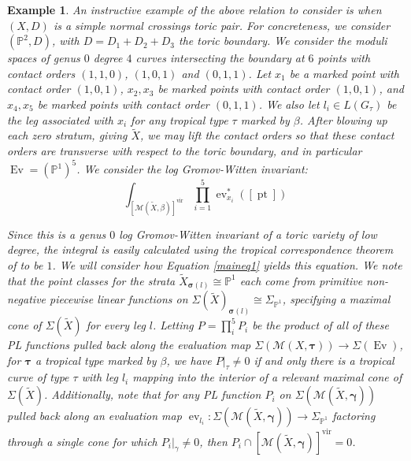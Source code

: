 \documentclass[12pt, oneside]{amsart}   	%
\newcounter{thm}
\newtheorem{example}[thm]{Example}
\newcommand{\vir}{\operatorname{vir}}
\newcommand{\pt}{\operatorname{pt}}
\newcommand{\ev}{\operatorname{ev}}
\newcommand{\Ev}{\operatorname{Ev}}
\numberwithin{equation}{section}
\numberwithin{thm}{section}
\numberwithin{figure}{section}
\begin{document}
\begin{example}
An instructive example of the above relation to consider is when $(X,D)$ is a simple normal crossings toric pair. For concreteness, we consider $(\mathbb{P}^2,D)$, with $D = D_1 + D_2+D_3$ the toric boundary. We consider the moduli spaces of genus $0$ degree $4$ curves intersecting the boundary at $6$ points with contact orders $(1,1,0)$, $(1,0,1)$ and $(0,1,1)$. Let $x_1$ be a marked point with contact order $(1,0,1)$, $x_2,x_3$ be marked points with contact order $(1,0,1)$, and $x_4,x_5$ be marked points with contact order $(0,1,1)$. We also let $l_i \in L(G_{\tau})$ be the leg associated with $x_i$ for any tropical type $\tau$ marked by $\beta$. After blowing up each zero stratum, giving $\widetilde{X}$, we may lift the contact orders so that these contact orders are transverse with respect to the toric boundary, and in particular $\Ev =( \mathbb{P}^1)^5$. We consider the log Gromov-Witten invariant:
\begin{equation}\label{exinv}
\int_{[\mathscr{M}(\widetilde{X},\beta)]^{\vir}} \prod_{i=1}^5\ev_{x_i}^*([\pt])
\end{equation}

Since this is a genus $0$ log Gromov-Witten invariant of a toric variety of low degree, the integral is easily calculated using the tropical correspondence theorem of \cite{NStrop} to be $1$. We will consider how Equation \ref{maineq1} yields this equation. We note that the point classes for the strata $\widetilde{X}_{\pmb\sigma(l)} \cong \mathbb{P}^1$ each come from primitive non-negative piecewise linear functions on $\Sigma(\widetilde{X})_{\pmb\sigma(l)} \cong \Sigma_{\mathbb{P}^1}$, specifying a maximal cone of $\Sigma(\widetilde{X})$ for every leg $l$. Letting $P = \prod_i^5 P_i$ be the product of all of these PL functions pulled back along the evaluation map $\Sigma(\mathscr{M}(X,\pmb\tau)) \rightarrow \Sigma(\Ev)$, for $\pmb\tau$ a tropical type marked by $\beta$, we have $P|_{\tau} \not= 0$ if and only there is a tropical curve of type $\tau$ with leg $l_i$ mapping into the interior of a relevant maximal cone of $\Sigma(\widetilde{X})$. Additionally, note that for any PL function $P_i$ on $\Sigma(\mathscr{M}(\widetilde{X},\pmb\gamma))$ pulled back along an evaluation map $\ev_{l_i}:\Sigma(\mathscr{M}(\widetilde{X},\pmb\gamma)) \rightarrow \Sigma_{\mathbb{P}^1}$ factoring through a single cone for which $P_i|_{\gamma} \not= 0$, then $P_i\cap [\mathscr{M}(\widetilde{X},\pmb\gamma)]^{\vir} = 0$. 


\end{example}
\end{document}
